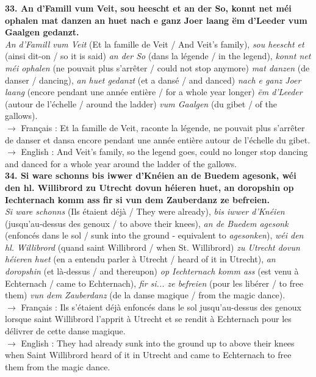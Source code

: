 \textbf{33. An d'Famill vum Veit, sou heescht et an der So, konnt net méi ophalen mat danzen an huet nach e ganz Joer laang ëm d'Leeder vum Gaalgen gedanzt.}\\
\textit{An d'Famill vum Veit} (Et la famille de Veit / And Veit's family), \textit{sou heescht et} (ainsi dit-on / so it is said) \textit{an der So} (dans la légende / in the legend), \textit{konnt net méi ophalen} (ne pouvait plus s'arrêter / could not stop anymore) \textit{mat danzen} (de danser / dancing), \textit{an huet gedanzt} (et a dansé / and danced) \textit{nach e ganz Joer laang} (encore pendant une année entière / for a whole year longer) \textit{ëm d'Leeder} (autour de l'échelle / around the ladder) \textit{vum Gaalgen} (du gibet / of the gallows).\\
$\rightarrow$ Français : Et la famille de Veit, raconte la légende, ne pouvait plus s'arrêter de danser et dansa encore pendant une année entière autour de l'échelle du gibet.\\
$\rightarrow$ English : And Veit's family, so the legend goes, could no longer stop dancing and danced for a whole year around the ladder of the gallows.\\[0.5em]

\textbf{34. Si ware schonns bis iwwer d'Knéien an de Buedem agesonk, wéi den hl. Willibrord zu Utrecht dovun héieren huet, an doropshin op Iechternach komm ass fir si vun dem Zauberdanz ze befreien.}\\
\textit{Si ware schonns} (Ils étaient déjà / They were already), \textit{bis iwwer d'Knéien} (jusqu'au-dessus des genoux / to above their knees), \textit{an de Buedem agesonk} (enfoncés dans le sol / sunk into the ground - equivalent to \textit{agesonken}), \textit{wéi den hl. Willibrord} (quand saint Willibrord / when St. Willibrord) \textit{zu Utrecht dovun héieren huet} (en a entendu parler à Utrecht / heard of it in Utrecht), \textit{an doropshin} (et là-dessus / and thereupon) \textit{op Iechternach komm ass} (est venu à Echternach / came to Echternach), \textit{fir si... ze befreien} (pour les libérer / to free them) \textit{vun dem Zauberdanz} (de la danse magique / from the magic dance).\\
$\rightarrow$ Français : Ils s'étaient déjà enfoncés dans le sol jusqu'au-dessus des genoux lorsque saint Willibrord l'apprit à Utrecht et se rendit à Echternach pour les délivrer de cette danse magique.\\
$\rightarrow$ English : They had already sunk into the ground up to above their knees when Saint Willibrord heard of it in Utrecht and came to Echternach to free them from the magic dance.

